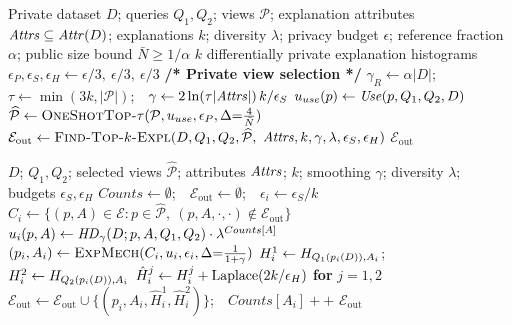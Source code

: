 \begin{algorithm}[t]
\caption{Private-Queries-Diff-Top-$k$-Explanation}
\label{alg:main}
\begin{algorithmic}[1]
\Require Private dataset $D$; queries $Q_1,Q_2$; views $\mathcal{P}$; explanation attributes $\mathit{Attrs}\subseteq\mathit{Attr}(D)$; explanations $k$; diversity $\lambda$; privacy budget $\epsilon$; reference fraction $\alpha$; public size bound $\bar N\ge1/\alpha$
\Ensure $k$ differentially private explanation histograms
\State $\epsilon_P,\epsilon_S,\epsilon_H \gets \epsilon/3,\ \epsilon/3,\ \epsilon/3$ 
\State \textbf{/* Private view selection */}
\State $\gamma_R\gets\alpha|D|$;\ \ $\tau\gets\min(3k,|\mathcal{P}|)$;\ \ $\gamma\gets 2\ln(\tau|\mathit{Attrs}|)\,k/\epsilon_S$
\State $u_{use}(p)\gets \mathit{Use}(p,Q_1,Q_2,D)$
\State $\widehat{\mathcal{P}}\gets \textsc{OneShotTop-}\tau(\mathcal{P},u_{use},\epsilon_P,\Delta{=}\tfrac{4}{\bar N})$
\State $\mathcal{E}_{\mathrm{out}}\gets \textsc{Find-Top-$k$-Expl}(D,Q_1,Q_2,\widehat{\mathcal{P}},$
\Statex \hspace{\algorithmicindent}$\mathit{Attrs},k,\gamma,\lambda,\epsilon_S,\epsilon_H)$
\State \Return $\mathcal{E}_{\mathrm{out}}$
\end{algorithmic}
\end{algorithm}

\begin{algorithm}[t]
\caption{Find-Top-$k$-Explanations}
\label{alg:topk}
\begin{algorithmic}[1]
\Require $D$; $Q_1,Q_2$; selected views $\widehat{\mathcal{P}}$; attributes $\mathit{Attrs}$; $k$; smoothing $\gamma$; diversity $\lambda$; budgets $\epsilon_S,\epsilon_H$
\State $Counts\gets\emptyset$;\ \ $\mathcal{E}_{\mathrm{out}}\gets\emptyset$;\ \ $\epsilon_i \gets \epsilon_S/k$
  \State $C_i \gets \{(p,A)\in\mathcal{E}: p\in\widehat{\mathcal{P}},\ (p,A,\cdot,\cdot)\notin\mathcal{E}_{\mathrm{out}}\}$
  \State $u_i(p,A)\gets \mathit{HD}_{\gamma}(D;p,A,Q_1,Q_2)\cdot \lambda^{Counts[A]}$
  \State $(p_i,A_i)\gets \textsc{ExpMech}(C_i,u_i,\epsilon_i,\Delta{=}\tfrac{1}{1+\gamma})$
  \State $H^1_i\gets H_{Q_1(p_i(D)),A_i}$;\ \ $H^2_i\gets H_{Q_2(p_i(D)),A_i}$
  \State $\hat H^j_i\gets H^j_i+\operatorname{Laplace}(2k/\epsilon_H)$ \textbf{for} $j=1,2$
  \State $\mathcal{E}_{\mathrm{out}}\gets\mathcal{E}_{\mathrm{out}}\cup\{(p_i,A_i,\hat H^1_i,\hat H^2_i)\}$;\ \ $Counts[A_i]{+}{+}$
\EndFor
\State \Return $\mathcal{E}_{\mathrm{out}}$
\end{algorithmic}
\end{algorithm}

